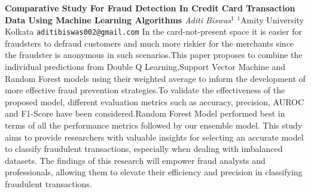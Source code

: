 
    \begin{conf-abstract}[]
        {\textbf{Comparative Study For Fraud Detection In Credit Card Transaction Data Using Machine Learning Algorithms}}
        {\textit{Aditi Biswas$^{1}$}}
        {$^{1}$Amity University Kolkata}
        {\texttt{aditibiswas002@gmail.com}}
        {In the card-not-present space it is easier for fraudsters to defraud customers and much more riskier for the merchants since the fraudster is anonymous in such scenarios.This paper proposes to combine the individual predictions from Double Q Learning,Support Vector Machine and Random Forest models using their weighted average to inform the development of more effective fraud prevention strategies.To validate the effectiveness of the proposed model, different evaluation metrics such as accuracy, precision, AUROC and F1-Score have been considered.Random Forest Model performed best in terms of all the performance metrics followed by our ensemble model. This study aims to provide researchers with valuable insights for selecting an accurate model to classify fraudulent transactions, especially when dealing with imbalanced datasets. The findings of this research will empower fraud analysts and professionals, allowing them to elevate their efficiency and precision in classifying fraudulent transactions.}
    \end{conf-abstract}
        